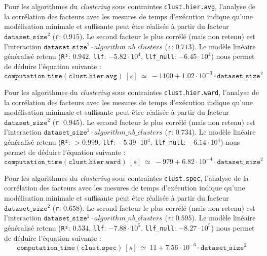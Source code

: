 			Pour les algorithmes du \textit{clustering} sous contraintes \texttt{clust.hier.avg}, l'analyse de la corrélation des facteurs avec les mesures de temps d'exécution indique qu'une modélisation minimale et suffisante peut être réalisée à partir du facteur $\texttt{dataset\_size}^{2}$ (\texttt{r}: $0.915$).
			Le second facteur le plus corrélé (mais non retenu) est l'interaction $\texttt{dataset\_size}^{2} \cdot algorithm\_nb\_clusters$ (\texttt{r}: $0.713$).
			Le modèle linéaire généralisé retenu (\texttt{R²}: $0.942$, \texttt{llf}: $-5.82 \cdot 10^{4}$, \texttt{llf\_null}: $-6.45 \cdot 10^{4}$) nous permet de déduire l'équation suivante :
			\begin{equation}
				\texttt{computation\_time}(\texttt{clust.hier.avg})~[s]~
				\simeq~-1100 + 1.02 \cdot 10^{-3} \cdot \texttt{dataset\_size}^{2}
			\end{equation}

			Pour les algorithmes du \textit{clustering} sous contraintes \texttt{clust.hier.ward}, l'analyse de la corrélation des facteurs avec les mesures de temps d'exécution indique qu'une modélisation minimale et suffisante peut être réalisée à partir du facteur $\texttt{dataset\_size}^{2}$ (\texttt{r}: $0.945$).
			Le second facteur le plus corrélé (mais non retenu) est l'interaction $\texttt{dataset\_size}^{2} \cdot algorithm\_nb\_clusters$ (\texttt{r}: $0.734$).
			Le modèle linéaire généralisé retenu (\texttt{R²}: $> 0.999$, \texttt{llf}: $-5.39 \cdot 10^{4}$, \texttt{llf\_null}: $-6.14 \cdot 10^{4}$) nous permet de déduire l'équation suivante :
			\begin{equation}
				\texttt{computation\_time}(\texttt{clust.hier.ward})~[s]~
				\simeq~-979 + 6.82 \cdot 10^{-4} \cdot \texttt{dataset\_size}^{2}
			\end{equation}
			
			Pour les algorithmes du \textit{clustering} sous contraintes \texttt{clust.spec}, l'analyse de la corrélation des facteurs avec les mesures de temps d'exécution indique qu'une modélisation minimale et suffisante peut être réalisée à partir du facteur $\texttt{dataset\_size}^{2}$ (\texttt{r}: $0.658$).
			Le second facteur le plus corrélé (mais non retenu) est l'interaction $\texttt{dataset\_size}^{2} \cdot algorithm\_nb\_clusters$ (\texttt{r}: $0.595$).
			Le modèle linéaire généralisé retenu (\texttt{R²}: $0.534$, \texttt{llf}: $-7.88 \cdot 10^{5}$, \texttt{llf\_null}: $-8.27 \cdot 10^{5}$) nous permet de déduire l'équation suivante :
			\begin{equation}
				\texttt{computation\_time}(\texttt{clust.spec})~[s]~
				\simeq~11 + 7.56 \cdot 10^{-6} \cdot \texttt{dataset\_size}^{2}
			\end{equation}
			
